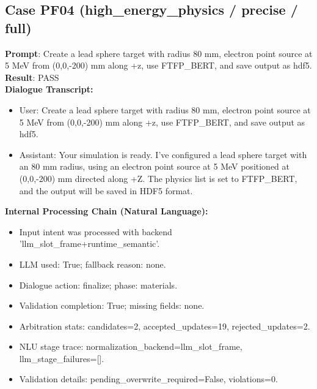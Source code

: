 \documentclass[11pt]{ctexart}
\begin{document}
\subsection{Case PF04 (high\_energy\_physics / precise / full)}
\textbf{Prompt}: Create a lead sphere target with radius 80 mm, electron point source at 5 MeV from (0,0,-200) mm along +z, use FTFP\_BERT, and save output as hdf5.\\
\textbf{Result}: PASS\\
\textbf{Dialogue Transcript:}
\begin{itemize}
\item User: Create a lead sphere target with radius 80 mm, electron point source at 5 MeV from (0,0,-200) mm along +z, use FTFP\_BERT, and save output as hdf5.
\item Assistant: Your simulation is ready. I've configured a lead sphere target with an 80 mm radius, using an electron point source at 5 MeV positioned at (0,0,-200) mm directed along +Z. The physics list is set to FTFP\_BERT, and the output will be saved in HDF5 format.
\end{itemize}
\textbf{Internal Processing Chain (Natural Language):}
\begin{itemize}
\item Input intent was processed with backend 'llm\_slot\_frame+runtime\_semantic'.
\item LLM used: True; fallback reason: none.
\item Dialogue action: finalize; phase: materials.
\item Validation completion: True; missing fields: none.
\item Arbitration stats: candidates=2, accepted\_updates=19, rejected\_updates=2.
\item NLU stage trace: normalization\_backend=llm\_slot\_frame, llm\_stage\_failures=[].
\item Validation details: pending\_overwrite\_required=False, violations=0.
\end{itemize}
\end{document}
